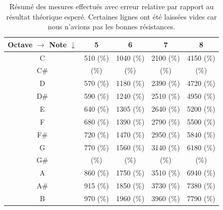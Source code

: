 \begin{table}[ht]
	\centering
		\begin{tabular}{|c|c|c|c|c|}
			\hline
				\specialcell{Octave $\rightarrow$ \\ Note $\downarrow$} & 5 & 6 & 7 & 8 \\
			\hline
				 C & \unit{510}{\milli\volt} (\%) & \unit{1040}{\milli\volt} (\%) & \unit{2100}{\milli\volt} (\%) & \unit{4150}{\milli\volt} (\%) \\
			\hline
				 C\# & \unit{}{\milli\volt} (\%) & \unit{}{\milli\volt} (\%) & \unit{}{\milli\volt} (\%) & \unit{}{\milli\volt} (\%) \\
			\hline
				 D &  \unit{570}{\milli\volt} (\%) & \unit{1180}{\milli\volt} (\%) & \unit{2390}{\milli\volt} (\%) & \unit{4720}{\milli\volt} (\%) \\
			\hline
				 D\# & \unit{590}{\milli\volt} (\%) & \unit{1240}{\milli\volt} (\%) & \unit{2510}{\milli\volt} (\%) & \unit{4950}{\milli\volt} (\%) \\
			\hline
				 E & \unit{640}{\milli\volt} (\%) & \unit{1305}{\milli\volt} (\%) & \unit{2640}{\milli\volt} (\%) & \unit{5200}{\milli\volt} (\%) \\
			\hline
				 F & \unit{680}{\milli\volt} (\%) & \unit{1390}{\milli\volt} (\%) & \unit{2790}{\milli\volt} (\%) & \unit{5500}{\milli\volt} (\%) \\
			\hline
				 F\# & \unit{720}{\milli\volt} (\%) & \unit{1470}{\milli\volt} (\%) & \unit{2950}{\milli\volt} (\%) & \unit{5840}{\milli\volt} (\%) \\
			\hline
				 G & \unit{770}{\milli\volt} (\%) & \unit{1560}{\milli\volt} (\%) & \unit{3140}{\milli\volt} (\%) & \unit{6180}{\milli\volt} (\%) \\
			\hline
				 G\# & \unit{}{\milli\volt} (\%) & \unit{}{\milli\volt} (\%) & \unit{}{\milli\volt} (\%) & \unit{}{\milli\volt} (\%) \\
			\hline
				 A & \unit{860}{\milli\volt} (\%) & \unit{1750}{\milli\volt} (\%) & \unit{3510}{\milli\volt} (\%) & \unit{6940}{\milli\volt} (\%) \\
			\hline
				 A\# & \unit{915}{\milli\volt} (\%) & \unit{1850}{\milli\volt} (\%) & \unit{3730}{\milli\volt} (\%) & \unit{7380}{\milli\volt} (\%) \\
			\hline
				 B & \unit{970}{\milli\volt} (\%) & \unit{1960}{\milli\volt} (\%) & \unit{3960}{\milli\volt} (\%) & \unit{7790}{\milli\volt} (\%) \\
			\hline
		\end{tabular}
	\caption{Résumé des mesures effectués avec erreur relative par rapport au résultat
	théorique esperé. Certaines lignes ont été laissées vides car nous n'avions pas les
	bonnes résistances.}
	\label{tab:keyboard-measure-vs-theroy}
\end{table}

